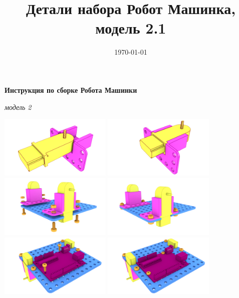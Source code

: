 \documentclass[twoside,a5paper,8pt]{article}
\title{Детали набора Робот Машинка, модель 2.1} %
\date{\today} %
\begin{document}
  \begin{center}
    \textbf{Инструкция по сборке Робота Машинки}
  \end{center}
  \begin{flushright}
    \emph{модель 2}
  \end{flushright}
   
   
  \includegraphics[height=30mm]{blender-render/render-instr/01-motor-block-dev.png}
  \includegraphics[height=30mm]{blender-render/render-instr/02-motor-block.png} \\
  \includegraphics[height=30mm]{blender-render/render-instr/03-top-block1-dev-view2.png}
  \includegraphics[height=30mm]{blender-render/render-instr/04-top-block1-view2.png} \\
  \includegraphics[height=30mm]{blender-render/render-instr/05-top-block2-dev.png}
  \includegraphics[height=30mm]{blender-render/render-instr/06-top-block2.png} \\
\end{document}
